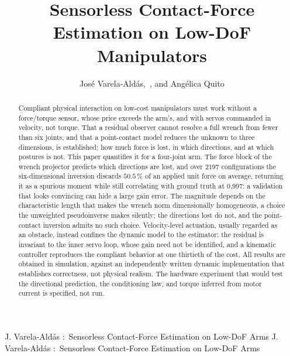 \documentclass{ieeeaccess}
\begin{document}

\title{Sensorless Contact-Force Estimation on Low-DoF Manipulators}

\author{{Jos\'e Varela-Ald\'as},~,
and {Ang\'elica Quito}}

\address[1]{Centro de Investigaci\'on MIST, Facultad de Ingenier\'ias,
Universidad Tecnol\'ogica Indoam\'erica, \mbox{Ambato 180103}, Ecuador
(e-mail: josevarela@uti.edu.ec)}

\address[2]{Faculty of Digital Engineering and Emerging Technologies,
International University of Ecuador UIDE, Quito 170411, Ecuador
(e-mail: anquitoca@uide.edu.ec)}


\markboth
{J. Varela-Ald\'as \headeretal:~Sensorless Contact-Force Estimation on Low-DoF Arms}
{J. Varela-Ald\'as \headeretal:~Sensorless Contact-Force Estimation on Low-DoF Arms}


\begin{abstract}
Compliant physical interaction on low-cost manipulators must work without a
force/torque sensor, whose price exceeds the arm's, and with servos
commanded in velocity, not torque. That a residual observer cannot resolve
a full wrench from fewer than six joints, and that a point-contact model reduces
the unknown to three dimensions, is established; how much force is lost, in which
directions, and at which postures is not. This paper quantifies it for a
four-joint arm. The force block of the wrench projector predicts which
directions are lost, and over $2197$ configurations the six-dimensional inversion
discards $50.5\,\%$ of an applied unit force on average, returning it as a
spurious moment while still correlating with ground truth at $0.997$: a
validation that looks convincing can hide a large gain error. The magnitude
depends on the characteristic length that makes the wrench norm dimensionally
homogeneous, a choice the unweighted pseudoinverse makes silently; the directions
lost do not, and the point-contact inversion admits no such choice.
Velocity-level actuation, usually regarded as an obstacle, instead confines the
dynamic model to the estimator: the residual is invariant to the inner servo
loop, whose gain need not be identified, and a kinematic controller reproduces
the compliant behavior at one thirtieth of the cost. All results are obtained
in simulation, against an independently written dynamic implementation that
establishes correctness, not physical realism. The hardware experiment that would
test the directional prediction, the conditioning law, and torque inferred from
motor current is specified, not run.
\end{abstract}
\end{document}
